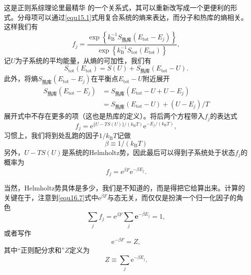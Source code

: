 这是正则系综理论里最精华%
%
的一个关系式，其可以重新改写成一个更便利的形式。分母项可以通过\eqref{equ15.1}式用复合系统的熵来表达，而分子和热库的熵相关。这样我们有
\begin{equation}
f_j = \frac{\exp\left\{k_\text{B}^{-1}S_\text{热库}(E_\text{tot}-E_j)\right\}}{\exp\left\{k_\text{B}^{-1}S_\text{tot}(E_\text{tot})\right\}} ,
\end{equation}
记$U$为子系统的平均能量，从熵的可加性，我们有
\begin{equation}
S_\text{tot}(E_\text{tot}) = S(U) + S_\text{热库}(E_\text{tot}-U).
\end{equation}
此外，将熵$S_\text{热库}(E_\text{tot}-E_j)$在平衡点$E_\text{tot}-U$附近展开
\begin{equation}
\begin{aligned}
S_\text{热库}(E_\text{tot}-E_j)& = S_\text{热库}(E_\text{tot}-U+U-E_j)\\
&= S_\text{热库}(E_\text{tot}-U) + (U-E_j)/T
\end{aligned}
\end{equation}
展开式中不存在更多的项（这也是热库的定义）。将后两个方程带入$f_j$的表达式
\begin{equation}
f_j = {\mathrm e}^{\{U-TS(U)\}/(k_\text{B}T)} {\mathrm e}^{-E_j/(k_\text{B}T)},
\end{equation}
习惯上，我们将到处乱跑的因子$1/k_\text{B}T$记做
\begin{equation}
\beta \equiv 1/(k_\text{B}T)
\end{equation}
另外，$U-TS(U)$是系统的Helmholtz势，因此最后可以得到子系统处于状态$f_j$的概率为
\begin{equation}
f_j = {\mathrm e}^{\beta F}{\mathrm e}^{-\beta E_j}.
\label{equ16.7}
\end{equation}

当然，Helmholtz势具体是多少，我们是不知道的，而是得把它给算出来。计算的关键在于，注意到\eqref{equ16.7}式中${\mathrm e}^{\beta F}$与态无关，而仅仅是扮演一个归一化因子的角色
\begin{equation}
\sum\limits_j f_j = {\mathrm e}^{\beta F}\sum\limits_j {\mathbf e}^{-\beta E_j} = 1,
\end{equation}
或者写作
\begin{equation}
{\mathrm e}^{-\beta F}=Z,
\label{equ16.9}
\end{equation}
其中“正则配分求和”$Z$定义为%
\begin{equation}
Z\equiv \sum\limits_j {\mathrm e}^{-\beta E_j}.
\label{equ16.10}
\end{equation}


